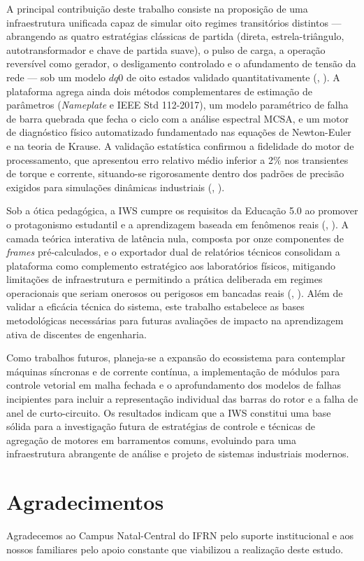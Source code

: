 \documentclass[a4paper]{ifacconf}
\begin{document}
A principal contribuição deste trabalho consiste na proposição de uma infraestrutura unificada capaz de simular oito regimes transitórios distintos --- abrangendo as quatro estratégias clássicas de partida (direta, estrela-triângulo, autotransformador e chave de partida suave), o pulso de carga, a operação reversível como gerador, o desligamento controlado e o afundamento de tensão da rede --- sob um modelo $dq0$ de oito estados validado quantitativamente (\citeauthor{usta2024mathematical}, \citeyear{usta2024mathematical}). A plataforma agrega ainda dois métodos complementares de estimação de parâmetros (\textit{Nameplate} e IEEE Std 112-2017), um modelo paramétrico de falha de barra quebrada que fecha o ciclo com a análise espectral MCSA, e um motor de diagnóstico físico automatizado fundamentado nas equações de Newton-Euler e na teoria de Krause. A validação estatística confirmou a fidelidade do motor de processamento, que apresentou erro relativo médio inferior a 2\% nos transientes de torque e corrente, situando-se rigorosamente dentro dos padrões de precisão exigidos para simulações dinâmicas industriais (\citeauthor{leroux2022static}, \citeyear{leroux2022static}).

Sob a ótica pedagógica, a IWS cumpre os requisitos da Educação 5.0 ao promover o protagonismo estudantil e a aprendizagem baseada em fenômenos reais (\citeauthor{cordeiro2024educacao}, \citeyear{cordeiro2024educacao}). A camada teórica interativa de latência nula, composta por onze componentes de \textit{frames} pré-calculados, e o exportador dual de relatórios técnicos consolidam a plataforma como complemento estratégico aos laboratórios físicos, mitigando limitações de infraestrutura e permitindo a prática deliberada em regimes operacionais que seriam onerosos ou perigosos em bancadas reais (\citeauthor{singh2019improving}, \citeyear{singh2019improving}). Além de validar a eficácia técnica do sistema, este trabalho estabelece as bases metodológicas necessárias para futuras avaliações de impacto na aprendizagem ativa de discentes de engenharia.

Como trabalhos futuros, planeja-se a expansão do ecossistema para contemplar máquinas síncronas e de corrente contínua, a implementação de módulos para controle vetorial em malha fechada e o aprofundamento dos modelos de falhas incipientes para incluir a representação individual das barras do rotor e a falha de anel de curto-circuito. Os resultados indicam que a IWS constitui uma base sólida para a investigação futura de estratégias de controle e técnicas de agregação de motores em barramentos comuns, evoluindo para uma infraestrutura abrangente de análise e projeto de sistemas industriais modernos.

\section*{Agradecimentos}

Agradecemos ao Campus Natal-Central do IFRN pelo suporte institucional e aos nossos familiares pelo apoio constante que viabilizou a realização deste estudo.


\end{document}
